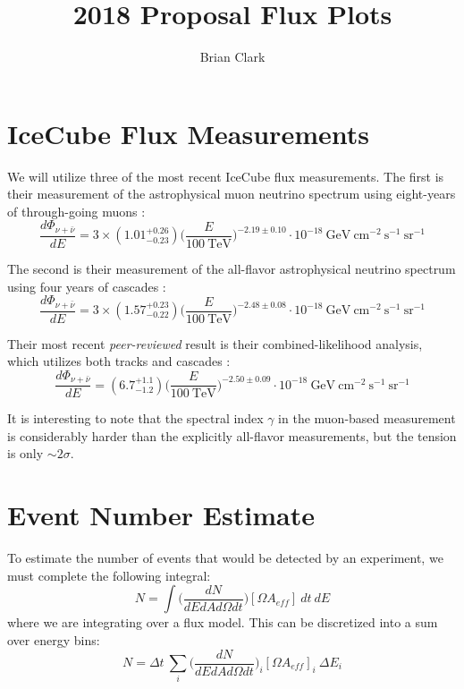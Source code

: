 \documentclass[preprint,12pt]{article}
\begin{document}
\title{2018 Proposal Flux Plots}
\author{Brian Clark}

\maketitle

\section{IceCube Flux Measurements}


We will utilize three of the most recent IceCube flux measurements. The first is their measurement of the astrophysical muon neutrino spectrum using eight-years of through-going muons \cite{PoS(ICRC2017)1005}:
\begin{equation}
\frac{d \Phi _ {\nu + \bar{\nu}}}{d E} = 3 \times (1.01^{+0.26}_{-0.23}) \Bigg( \frac{E}{100~\textrm{TeV} } \Bigg) ^{-2.19 \pm 0.10} \cdot 10^{-18} ~\textrm{GeV} ~\textrm{cm}^{-2} ~\textrm{s}^{-1} ~\textrm{sr}^{-1}
\end{equation}

The second is their measurement of the all-flavor astrophysical neutrino spectrum using four years of cascades \cite{PoS(ICRC2017)968}:
\begin{equation}
\frac{d \Phi _ {\nu + \bar{\nu}}}{d E} = 3 \times (1.57^{+0.23}_{-0.22}) \Bigg( \frac{E}{100~\textrm{TeV} } \Bigg) ^{-2.48 \pm 0.08} \cdot 10^{-18} ~\textrm{GeV} ~\textrm{cm}^{-2} ~\textrm{s}^{-1} ~\textrm{sr}^{-1}
\end{equation}

Their most recent \textit{peer-reviewed} result is their combined-likelihood analysis, which utilizes both tracks and cascades \cite{Aartsen:2015knd}:
\begin{equation}
\frac{d \Phi _ {\nu + \bar{\nu}}}{d E} = (6.7^{+1.1}_{-1.2}) \Bigg( \frac{E}{100~\textrm{TeV} } \Bigg) ^{-2.50 \pm 0.09} \cdot 10^{-18} ~\textrm{GeV} ~\textrm{cm}^{-2} ~\textrm{s}^{-1} ~\textrm{sr}^{-1}
\end{equation}

It is interesting to note that the spectral index $\gamma$ in the muon-based measurement is considerably harder than the explicitly all-flavor measurements, but the tension is only $\sim 2\sigma$.

\section{Event Number Estimate}
To estimate the number of events that would be detected by an experiment, we must complete the following integral:
\begin{equation}
N = \int \bigg( \frac{dN}{dE dA d\Omega dt} \bigg) [ \Omega A_{{eff}}] ~dt ~dE
\end{equation}
where we are integrating over a flux model. This can be discretized into a sum over energy bins:
\begin{equation}
N = \Delta t ~ \sum_i \bigg( \frac{dN}{dE dA d\Omega dt} \bigg)_i [ \Omega A_{eff}]_i ~\Delta E_i
\end{equation}






%
 
\end{document}
